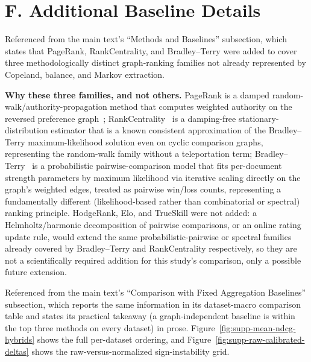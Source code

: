\documentclass[manuscript,anonymous,review]{acmart}
\begin{document}
\section{F. Additional Baseline Details}
\label{sec:supp-baselines}

Referenced from the main text's ``Methods and Baselines'' subsection, which
states that PageRank, RankCentrality, and Bradley--Terry were added to
cover three methodologically distinct graph-ranking families not already
represented by Copeland, balance, and Markov extraction.

\textbf{Why these three families, and not others.} PageRank is a damped
random-walk/authority-propagation method that computes weighted authority
on the reversed preference graph~\cite{page1999pagerank}; RankCentrality~\cite{negahban2017rankcentrality}
is a damping-free stationary-distribution estimator that is a known
consistent approximation of the Bradley--Terry maximum-likelihood solution
even on cyclic comparison graphs, representing the random-walk family
without a teleportation term; Bradley--Terry~\cite{bradley1952rank} is a
probabilistic pairwise-comparison model that fits per-document strength
parameters by maximum likelihood via iterative scaling directly on the
graph's weighted edges, treated as pairwise win/loss counts, representing a
fundamentally different (likelihood-based rather than combinatorial or
spectral) ranking principle. HodgeRank, Elo, and TrueSkill were not added:
a Helmholtz/harmonic decomposition of pairwise comparisons, or an online
rating update rule, would extend the same probabilistic-pairwise or
spectral families already covered by Bradley--Terry and RankCentrality
respectively, so they are not a scientifically required addition for this
study's comparison, only a possible future extension.

Referenced from the main text's ``Comparison with Fixed Aggregation
Baselines'' subsection, which reports the same information in its
dataset-macro comparison table and states its practical
takeaway (a graph-independent baseline is within the top three methods on
every dataset) in prose. Figure~\ref{fig:supp-mean-ndcg-hybrids} shows the
full per-dataset ordering, and Figure~\ref{fig:supp-raw-calibrated-deltas}
shows the raw-versus-normalized sign-instability grid.
\end{document}
